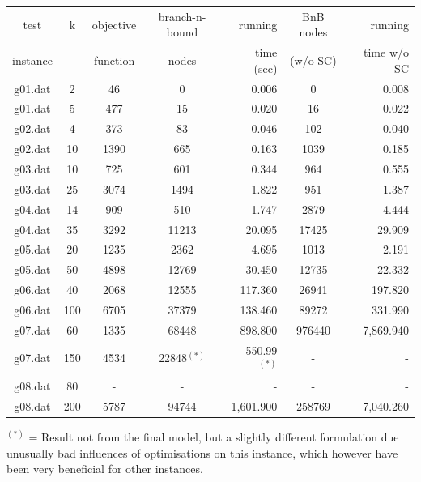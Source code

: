 \documentclass[,%
			paper=a4,%
			DIV14,
			liststotoc,
			bibtotoc,
			draft=false,%
			numbers=noendperiod
			]{scrartcl}
\begin{document}
\begin{minipage}{\linewidth} %
\begin{tabular}{||c||cccr|cr||}
\hline
test     & k & objective  & branch-n-bound & running   & BnB nodes & running\\
instance &   & function   & nodes          & time (sec)& (w/o SC)  & time w/o SC \\
\hline
g01.dat	&	2	&	46	&	0	&	0.006	&	0	&	0.008	\\
g01.dat	&	5	&	477	&	15	&	0.020	&	16	&	0.022	\\
g02.dat	&	4	&	373	&	83	&	0.046	&	102	&	0.040	\\
g02.dat	&	10	&	1390	&	665	&	0.163	&	1039	&	0.185	\\
g03.dat	&	10	&	725	&	601	&	0.344	&	964	&	0.555	\\
g03.dat	&	25	&	3074	&	1494	&	1.822	&	951	&	1.387	\\
g04.dat	&	14	&	909	&	510	&	1.747	&	2879	&	4.444	\\
g04.dat	&	35	&	3292	&	11213	&	20.095	&	17425	&	29.909	\\
g05.dat	&	20	&	1235	&	2362	&	4.695	&	1013	&	2.191	\\
g05.dat	&	50	&	4898	&	12769	&	30.450	&	12735	&	22.332	\\
g06.dat	&	40	&	2068	&	12555	&	117.360	&	26941	&	197.820	\\
g06.dat	&	100	&	6705	&	37379	&	138.460	&	89272	&	331.990	\\
g07.dat	&	60	&	1335	&	68448	&	898.800	&	976440	&	7,869.940	\\
g07.dat	&	150	&	4534	&	22848$^{(*)}$	&	550.99$^{(*)}$	&	-	&	-	\\
g08.dat	&	80	&	-	&	-	&	-	&	-	&	-	\\
g08.dat	&	200	&	5787	&	94744	&	1,601.900	&	258769	&	7,040.260	\\
\hline
\end{tabular}

$^{(*)}$ = Result not from the final model, but a slightly different formulation due unusually bad influences of optimisations on this instance, which however have been very beneficial for other instances.
\end{minipage}
\end{document}
